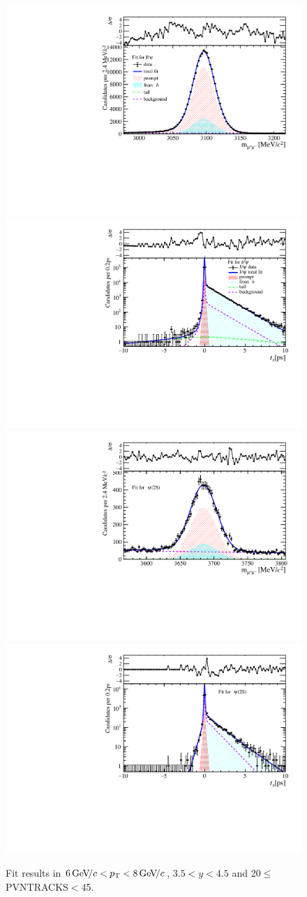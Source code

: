 \begin{figure}[H]
\begin{center}
\includegraphics[width=0.47\linewidth]{pdf/Jpsi/drawmass/n2y3pt4.pdf}
\includegraphics[width=0.47\linewidth]{pdf/Jpsi/2DFit/n2y3pt4.pdf}
\vspace*{-0.5cm}
\includegraphics[width=0.47\linewidth]{pdf/Psi2S/drawmass/n2y3pt4.pdf}
\includegraphics[width=0.47\linewidth]{pdf/Psi2S/2DFit/n2y3pt4.pdf}
\vspace*{-0.5cm}
\end{center}
\caption{Fit results in $6\text{\,Ge\kern -0.1em V\!/}c<p_{\mathrm{T}}<8\text{\,Ge\kern -0.1em V\!/}c$, $3.5<y<4.5$ and 20$\leq$PVNTRACKS$<$45.}
\label{Fitn2y3pt4}
\end{figure}
